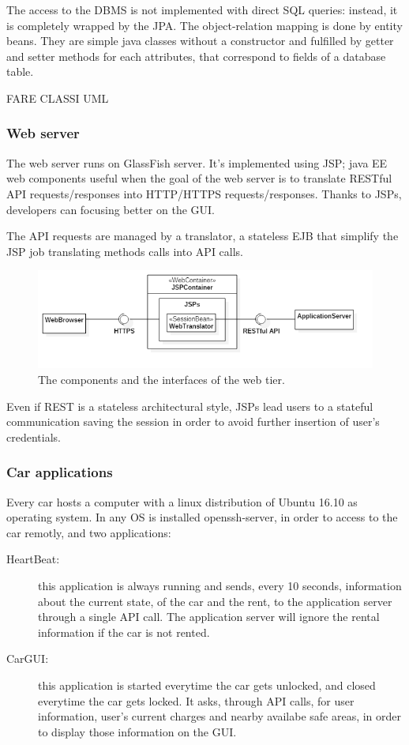The access to the DBMS is not implemented with direct SQL queries: instead, it is completely wrapped by the JPA. The object-relation mapping is done by entity beans. They are simple java classes without a constructor and fulfilled by getter and setter methods for each attributes, that correspond to fields of a database table.

FARE CLASSI UML

\subsubsection{Web server}

The web server runs on GlassFish server. It's implemented using JSP; java EE web components useful when the goal of the web server is to translate RESTful API requests/responses into  HTTP/HTTPS requests/responses. Thanks to JSPs, developers can focusing better on the GUI.

The API requests are managed by a translator, a stateless EJB that simplify the JSP job translating methods calls into API calls.


\begin{figure}[H]
	\centering
	\includegraphics[width=\textwidth, keepaspectratio]{diagrams/WebComponents.png}
	\caption{The components and the interfaces of the web tier.}
	\label {fig:web-components}
\end{figure}

Even if REST is a stateless architectural style, JSPs lead users to a stateful communication saving the session in order to avoid further insertion of user's credentials.

\subsubsection{Car applications}

Every car hosts a computer with a linux distribution of Ubuntu 16.10 as operating system. In any OS is installed openssh-server, in order to access to the car remotly, and two applications:
\begin{description}
	\item[HeartBeat:] this application is always running and sends, every 10 seconds, information about the current state, of the car and the rent, to the application server through a single API call. The application server will ignore the rental information if the car is not rented.
	\item[CarGUI:] this application is started everytime the car gets unlocked, and closed everytime the car gets locked. It asks, through API calls, for user information, user's current charges and nearby availabe safe areas, in order to display those information on the GUI.
\end{description}

